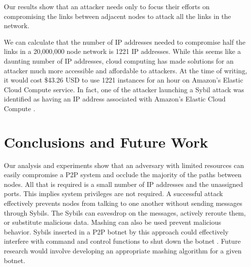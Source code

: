 Our results show that an attacker needs only to focus their efforts on compromising the links between adjacent nodes to attack all the links in the network.


We can calculate that the number of IP addresses needed to compromise half the links in a 20,000,000 node network is 1221 IP addresses.
While this seems like a daunting number of IP addresses, cloud computing has made solutions for an attacker much more accessible and affordable to attackers.
At the time of writing, it would cost \$43.26 USD to use 1221 instances for an hour on Amazon's Elastic Cloud Compute service.
In fact, one of the attacker launching a Sybil attack was identified as having an IP address associated with Amazon's Elastic Cloud Compute \cite{sybilbit}.








\section{Conclusions and Future Work}\label{sec:conclusions-and-future-work}
\label{sec:horror}

Our analysis and experiments show that an adversary with limited resources can easily compromise a P2P system and occlude the majority of the paths between nodes.
All that is required is a small number of IP addresses and the unassigned ports.
This implies system privileges are not required.
A successful attack effectively prevents nodes from talking to one another without sending messages through Sybils.
The Sybils can eavesdrop on the messages, actively reroute them, or substitute malicious data.
Mashing can also be used prevent malicious behavior.
Sybils inserted in a P2P botnet by this approach could effectively interfere with command and control functions to shut down the botnet \cite{white2010overcoming}.
Future research would involve developing an appropriate mashing algorithm for a given botnet.


